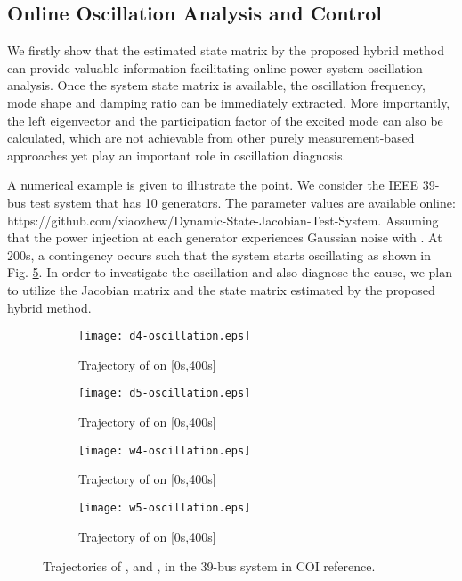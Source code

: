 \documentclass[journal]{IEEEtran}
\begin{document}
\subsection{Online Oscillation Analysis and Control}
We firstly show that the estimated state matrix by the proposed hybrid method can provide valuable information facilitating online power system oscillation analysis. Once the system state matrix is available, the oscillation frequency, mode shape and damping ratio can be immediately extracted. More importantly, the left eigenvector and the participation factor of the excited mode can also be calculated, which are not achievable from other purely measurement-based approaches yet play an important role in oscillation diagnosis.


A numerical example is given to illustrate the point. We consider the IEEE 39-bus test system that has 10 generators. The parameter values are available online: https://github.com/xiaozhew/Dynamic-State-Jacobian-Test-System. Assuming that the power injection at each generator experiences Gaussian noise with . At 200s, a contingency occurs such that the system starts oscillating as shown in Fig. \ref{39-oscillation}. In order to investigate the oscillation and also diagnose the cause, we plan to utilize the Jacobian matrix and the state matrix estimated by the proposed hybrid method.
\begin{figure}[!ht]
\centering
\begin{subfigure}[t]{0.52\linewidth}
\texttt{[image: d4-oscillation.eps]}
\caption{Trajectory of  on [0s,400s]}\label{d4-oscillation}
\end{subfigure}\begin{subfigure}[t]{0.48\linewidth}
\texttt{[image: d5-oscillation.eps]}
\caption{Trajectory of  on [0s,400s]}\label{d5-oscillation}
\end{subfigure}
\begin{subfigure}[t]{0.5\linewidth}
\texttt{[image: w4-oscillation.eps]}
\caption{Trajectory of  on [0s,400s]}\label{w4-oscillation}
\end{subfigure}\begin{subfigure}[t]{0.5\linewidth}
\texttt{[image: w5-oscillation.eps]}
\caption{Trajectory of  on [0s,400s]}\label{w5-oscillation}
\end{subfigure}
\caption{Trajectories of ,  and ,  in the 39-bus system in COI reference.}\label{39-oscillation}
\end{figure}
\end{document}
